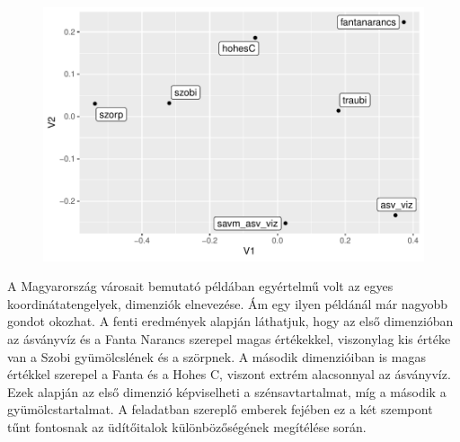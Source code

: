 \documentclass[
  letterpaper,
]{krantz}
\makeatletter
\newenvironment{Shaded}{\begin{snugshade}}{\end{snugshade}}
\newcommand{\AttributeTok}[1]{\textcolor[rgb]{0.40,0.45,0.13}{#1}}
\newcommand{\CommentTok}[1]{\textcolor[rgb]{0.37,0.37,0.37}{#1}}
\newcommand{\FunctionTok}[1]{\textcolor[rgb]{0.28,0.35,0.67}{#1}}
\newcommand{\NormalTok}[1]{\textcolor[rgb]{0.00,0.23,0.31}{#1}}
\newcommand{\SpecialCharTok}[1]{\textcolor[rgb]{0.37,0.37,0.37}{#1}}
\newenvironment{kframe}{%
\medskip{}
\setlength{\fboxsep}{.8em}
 \def\at@end@of@kframe{}%
 \ifinner\ifhmode%
  \def\at@end@of@kframe{\end{minipage}}%
  \begin{minipage}{\columnwidth}%
 \fi\fi%
 \def\FrameCommand##1{\hskip\@totalleftmargin \hskip-\fboxsep
 \colorbox{shadecolor}{##1}\hskip-\fboxsep
     \hskip-\linewidth \hskip-\@totalleftmargin \hskip\columnwidth}%
 \MakeFramed {\advance\hsize-\width
   \@totalleftmargin\z@ \linewidth\hsize
   \@setminipage}}%
 {\par\unskip\endMakeFramed%
 \at@end@of@kframe}
\renewenvironment{Shaded}{\begin{kframe}}{\end{kframe}}
\makeatother
\begin{document}
\begin{Shaded}
\end{Shaded}

\begin{figure}[H]

{\centering \includegraphics{./sec_tobbdimenzios_skalazas_files/figure-pdf/unnamed-chunk-19-1.pdf}

}

\end{figure}

\begin{Shaded}
\end{Shaded}

A Magyarország városait bemutató példában egyértelmű volt az egyes
koordinátatengelyek, dimenziók elnevezése. Ám egy ilyen példánál már
nagyobb gondot okozhat. A fenti eredmények alapján láthatjuk, hogy az
első dimenzióban az ásványvíz és a Fanta Narancs szerepel magas
értékekkel, viszonylag kis értéke van a Szobi gyümölcslének és a
szörpnek. A második dimenzióiban is magas értékkel szerepel a Fanta és a
Hohes C, viszont extrém alacsonnyal az ásványvíz. Ezek alapján az első
dimenzió képviselheti a szénsavtartalmat, míg a második a
gyümölcstartalmat. A feladatban szereplő emberek fejében ez a két
szempont tűnt fontosnak az üdítőitalok különbözőségének megítélése
során.
\end{document}
